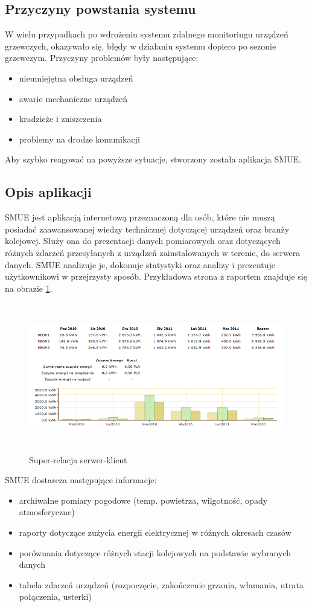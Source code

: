 \subsection{Przyczyny powstania systemu}
W wielu przypadkach po wdrożeniu systemu zdalnego monitoringu urządzeń grzewczych, okazywało się, błędy w działaniu systemu dopiero po sezonie grzewczym. Przyczyny problemów były następujące:
\begin{itemize}
\item nieumiejętna obsługa urządzeń
\item awarie mechaniczne urządzeń
\item kradzieże i zniszczenia
\item problemy na drodze komunikacji
\end{itemize}

Aby szybko reagować na powyższe sytuacje, stworzony została aplikacja SMUE.

\subsection{Opis aplikacji}
SMUE jest aplikacją internetową przeznaczoną dla osób, które nie muszą posiadać zaawansowanej wiedzy technicznej dotyczącej urządzeń oraz branży kolejowej. Służy ona do prezentacji danych pomiarowych oraz dotyczących różnych zdarzeń przesyłanych z urządzeń zainstalowanych w terenie, do serwera danych. SMUE analizuje je, dokonuje statystyki oraz analizy i prezentuje użytkownikowi w przejrzysty sposób. Przykładowa strona z raportem znajduje się na obrazie \ref{fig:smue}.\\

\begin{figure}[h]
		\includegraphics[height=65mm]{./img/smue.png}
		\caption{Super-relacja serwer-klient}
		\label{fig:smue}
\end{figure}

SMUE dostarcza następujące informacje:
\begin{itemize}
\item archiwalne pomiary pogodowe (temp. powietrza, wilgotność, opady atmosferyczne)
\item raporty dotyczące zużycia energii elektrycznej w różnych okresach czasów
\item porównania dotyczące różnych stacji kolejowych na podstawie wybranych danych
\item tabela zdarzeń urządzeń (rozpoczęcie, zakończenie grzania, włamania, utrata połączenia, usterki)
\end{itemize}

